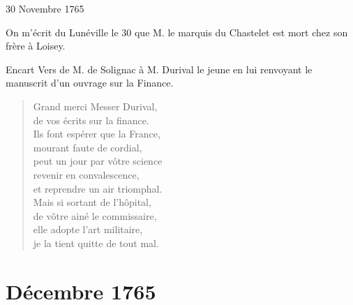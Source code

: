                      \begin{diary}{30 Novembre 1765}{}
                        
                         On m'écrit du Lunéville
                           le 30 que M.
                              le marquis du Chastelet est mort chez
                           son
                              frère à Loisey. \bigskip
        
        
                     \end{diary}
                     
                     
                     \begin{diary}{Encart}{} Vers de M. de
                                 Solignac à M.
                                 Durival le jeune en lui renvoyant
                              le manuscrit d'un ouvrage sur la
                                 Finance. \bigskip
        
        
                              \begin{verse}Grand merci Messer
                                       Durival,\\de vos écrits sur la finance.\\Ils font espérer que la
                                       France,\\mourant faute de cordial,\\peut un jour par vôtre science\\revenir en convalescence,\\et reprendre un air triomphal.\\Mais si sortant de l'hôpital,\\de vôtre ainé le
                                       commissaire,\\elle adopte l'art militaire,\\je la tient quitte de tout mal.\\\end{verse}
        \bigskip
        
        
                           \end{diary}
                     
                  \chapter*{Décembre 1765}
                     
                     
                     
